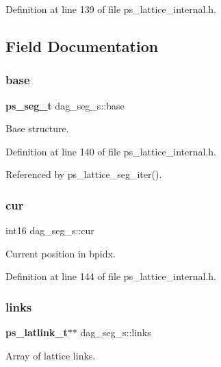 Definition at line 139 of file ps\+\_\+lattice\+\_\+internal.\+h.



\subsection{Field Documentation}
\mbox{\label{structdag__seg__s_a72f90e137c1f83ab3df6ecd5e1b6dc71}} 
\subsubsection{base}
{\footnotesize\ttfamily \textbf{ ps\+\_\+seg\+\_\+t} dag\+\_\+seg\+\_\+s\+::base}



Base structure. 



Definition at line 140 of file ps\+\_\+lattice\+\_\+internal.\+h.



Referenced by ps\+\_\+lattice\+\_\+seg\+\_\+iter().

\mbox{\label{structdag__seg__s_a0fed697e06d12e5a0405fdcb0d97faf1}} 
\subsubsection{cur}
{\footnotesize\ttfamily int16 dag\+\_\+seg\+\_\+s\+::cur}



Current position in bpidx. 



Definition at line 144 of file ps\+\_\+lattice\+\_\+internal.\+h.

\mbox{\label{structdag__seg__s_a5fcc22d787e4db1bdc728ff8faead738}} 
\subsubsection{links}
{\footnotesize\ttfamily \textbf{ ps\+\_\+latlink\+\_\+t}$\ast$$\ast$ dag\+\_\+seg\+\_\+s\+::links}



Array of lattice links. 



